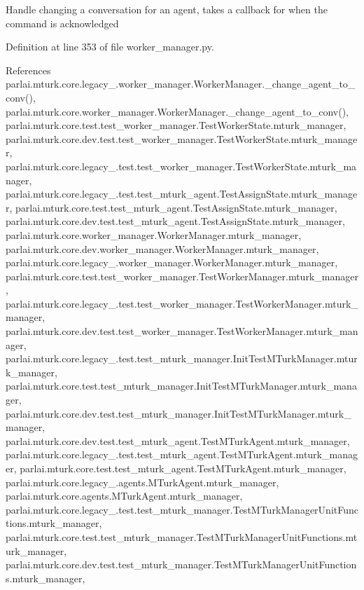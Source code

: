 \begin{DoxyVerb}Handle changing a conversation for an agent, takes a callback for
when the command is acknowledged
\end{DoxyVerb}
 

Definition at line 353 of file worker\+\_\+manager.\+py.



References parlai.\+mturk.\+core.\+legacy\+\_.\+worker\+\_\+manager.\+Worker\+Manager.\+\_\+change\+\_\+agent\+\_\+to\+\_\+conv(), parlai.\+mturk.\+core.\+worker\+\_\+manager.\+Worker\+Manager.\+\_\+change\+\_\+agent\+\_\+to\+\_\+conv(), parlai.\+mturk.\+core.\+test.\+test\+\_\+worker\+\_\+manager.\+Test\+Worker\+State.\+mturk\+\_\+manager, parlai.\+mturk.\+core.\+dev.\+test.\+test\+\_\+worker\+\_\+manager.\+Test\+Worker\+State.\+mturk\+\_\+manager, parlai.\+mturk.\+core.\+legacy\+\_.\+test.\+test\+\_\+worker\+\_\+manager.\+Test\+Worker\+State.\+mturk\+\_\+manager, parlai.\+mturk.\+core.\+legacy\+\_.\+test.\+test\+\_\+mturk\+\_\+agent.\+Test\+Assign\+State.\+mturk\+\_\+manager, parlai.\+mturk.\+core.\+test.\+test\+\_\+mturk\+\_\+agent.\+Test\+Assign\+State.\+mturk\+\_\+manager, parlai.\+mturk.\+core.\+dev.\+test.\+test\+\_\+mturk\+\_\+agent.\+Test\+Assign\+State.\+mturk\+\_\+manager, parlai.\+mturk.\+core.\+worker\+\_\+manager.\+Worker\+Manager.\+mturk\+\_\+manager, parlai.\+mturk.\+core.\+dev.\+worker\+\_\+manager.\+Worker\+Manager.\+mturk\+\_\+manager, parlai.\+mturk.\+core.\+legacy\+\_.\+worker\+\_\+manager.\+Worker\+Manager.\+mturk\+\_\+manager, parlai.\+mturk.\+core.\+test.\+test\+\_\+worker\+\_\+manager.\+Test\+Worker\+Manager.\+mturk\+\_\+manager, parlai.\+mturk.\+core.\+legacy\+\_.\+test.\+test\+\_\+worker\+\_\+manager.\+Test\+Worker\+Manager.\+mturk\+\_\+manager, parlai.\+mturk.\+core.\+dev.\+test.\+test\+\_\+worker\+\_\+manager.\+Test\+Worker\+Manager.\+mturk\+\_\+manager, parlai.\+mturk.\+core.\+legacy\+\_.\+test.\+test\+\_\+mturk\+\_\+manager.\+Init\+Test\+M\+Turk\+Manager.\+mturk\+\_\+manager, parlai.\+mturk.\+core.\+test.\+test\+\_\+mturk\+\_\+manager.\+Init\+Test\+M\+Turk\+Manager.\+mturk\+\_\+manager, parlai.\+mturk.\+core.\+dev.\+test.\+test\+\_\+mturk\+\_\+manager.\+Init\+Test\+M\+Turk\+Manager.\+mturk\+\_\+manager, parlai.\+mturk.\+core.\+dev.\+test.\+test\+\_\+mturk\+\_\+agent.\+Test\+M\+Turk\+Agent.\+mturk\+\_\+manager, parlai.\+mturk.\+core.\+legacy\+\_.\+test.\+test\+\_\+mturk\+\_\+agent.\+Test\+M\+Turk\+Agent.\+mturk\+\_\+manager, parlai.\+mturk.\+core.\+test.\+test\+\_\+mturk\+\_\+agent.\+Test\+M\+Turk\+Agent.\+mturk\+\_\+manager, parlai.\+mturk.\+core.\+legacy\+\_.\+agents.\+M\+Turk\+Agent.\+mturk\+\_\+manager, parlai.\+mturk.\+core.\+agents.\+M\+Turk\+Agent.\+mturk\+\_\+manager, parlai.\+mturk.\+core.\+legacy\+\_.\+test.\+test\+\_\+mturk\+\_\+manager.\+Test\+M\+Turk\+Manager\+Unit\+Functions.\+mturk\+\_\+manager, parlai.\+mturk.\+core.\+test.\+test\+\_\+mturk\+\_\+manager.\+Test\+M\+Turk\+Manager\+Unit\+Functions.\+mturk\+\_\+manager, parlai.\+mturk.\+core.\+dev.\+test.\+test\+\_\+mturk\+\_\+manager.\+Test\+M\+Turk\+Manager\+Unit\+Functions.\+mturk\+\_\+manager, 